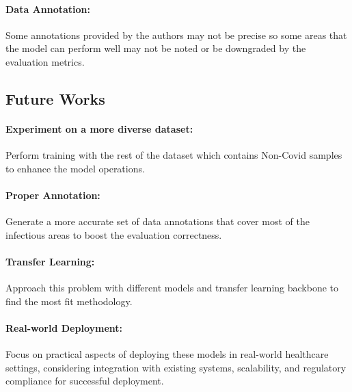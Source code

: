 \documentclass[]{acmsiggraph}
\begin{document}
\paragraph{Data Annotation:}Some annotations provided by the authors may not be precise so some areas that the model can perform well may not be noted or be downgraded by the evaluation metrics.

\subsection{Future Works}

\paragraph{Experiment on a more diverse dataset:}Perform training with the rest of the dataset which contains Non-Covid samples to enhance the model operations.

\paragraph{Proper Annotation:}Generate a more accurate set of data annotations that cover most of the infectious areas to boost the evaluation correctness.

\paragraph{Transfer Learning:} Approach this problem with different models and transfer learning backbone to find the most fit methodology.

\paragraph{Real-world Deployment:} Focus on practical aspects of deploying these models in real-world healthcare settings, considering integration with existing systems, scalability, and regulatory compliance for successful deployment.



\end{document}
